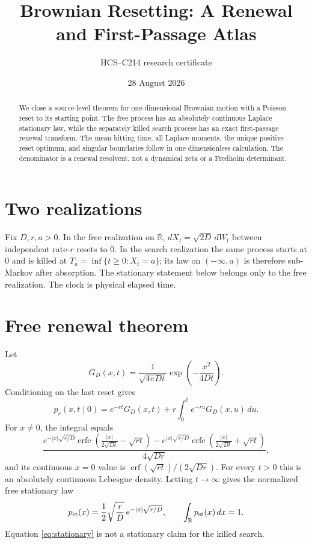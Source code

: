 \documentclass[10pt]{article}
\title{Brownian Resetting: A Renewal and First-Passage Atlas}
\author{HCS--C214 research certificate}
\date{28 August 2026}
\newcommand{\R}{\mathbb R}
\begin{document}
\maketitle

\begin{abstract}
We close a source-level theorem for one-dimensional Brownian motion with a
Poisson reset to its starting point.  The free process has an absolutely
continuous Laplace stationary law, while the separately killed search process
has an exact first-passage renewal transform.  The mean hitting time, all
Laplace moments, the unique positive reset optimum, and singular boundaries
follow in one dimensionless calculation.  The denominator is a renewal
resolvent, not a dynamical zeta or a Fredholm determinant.
\end{abstract}

\section{Two realizations}
Fix $D,r,a>0$.  In the free realization on $\R$,
$dX_t=\sqrt{2D}\,dW_t$ between independent rate-$r$ resets to $0$.
In the search realization the same process starts at $0$ and is killed at
$T_a=\inf\{t\geq0:X_t=a\}$; its law on $(-\infty,a)$ is therefore
sub-Markov after absorption.  The stationary statement below belongs only to
the free realization.  The clock is physical elapsed time.

\section{Free renewal theorem}
Let
\[
 G_D(x,t)=\frac{1}{\sqrt{4\pi Dt}}\exp\!\left(-\frac{x^2}{4Dt}\right).
\]
Conditioning on the last reset gives
\begin{equation}
p_r(x,t\mid0)=e^{-rt}G_D(x,t)+r\int_0^t e^{-ru}G_D(x,u)\,du .
\label{eq:renewal}
\end{equation}
For $x\ne0$, the integral equals
\[
\frac{e^{-|x|\sqrt{r/D}}\operatorname{erfc}(\frac{|x|}{2\sqrt{Dt}}-\sqrt{rt})
-e^{|x|\sqrt{r/D}}\operatorname{erfc}(\frac{|x|}{2\sqrt{Dt}}+\sqrt{rt})}{4\sqrt{Dr}},
\]
and its continuous $x=0$ value is $\operatorname{erf}(\sqrt{rt})/(2\sqrt{Dr})$.
For every $t>0$ this is an absolutely continuous Lebesgue density.  Letting
$t\to\infty$ gives the normalized free stationary law
\begin{equation}
p_{\rm st}(x)=\frac12\sqrt{\frac rD}\,e^{-|x|\sqrt{r/D}},
\qquad \int_{\R}p_{\rm st}(x)\,dx=1.
\label{eq:stationary}
\end{equation}
Equation \eqref{eq:stationary} is not a stationary claim for the killed search.
\end{document}
